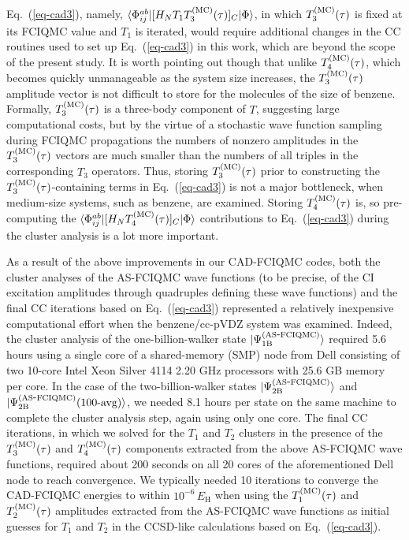 \documentclass[journal=jcp,manuscript=suppinfo]{achemso}
\begin{document}
Eq.\ (\ref{eq-cad3}), namely, $\langle \Phi_{ij}^{ab} | [ H_N T_{1} T_{3}^{\rm (MC)}(\tau) ]_C | \Phi \rangle$,
in which $T_{3}^{\rm (MC)}(\tau)$ is fixed at its FCIQMC value and $T_{1}$ is iterated, would require
additional changes in the CC routines used to set up Eq.\ (\ref{eq-cad3}) in this work, which are beyond the
scope of the present study. It is worth pointing out though that unlike $T_{4}^{\rm (MC)}(\tau)$,
which becomes quickly unmanageable as the system size increases, the $T_{3}^{\rm (MC)}(\tau)$ amplitude
vector is not difficult to store for the molecules of the size of benzene.
Formally, $T_{3}^{\rm (MC)}(\tau)$ is a three-body component of $T$, suggesting large computational costs,
but by the virtue of a stochastic wave function sampling during
FCIQMC propagations the numbers of nonzero amplitudes in the $T_{3}^{\rm (MC)}(\tau)$ vectors
are much smaller than the numbers of all triples in the corresponding $T_{3}$ operators. Thus, storing
$T_{3}^{\rm (MC)}(\tau)$ prior to constructing the $T_{3}^{\rm (MC)}(\tau)$-containing terms in
Eq.\ (\ref{eq-cad3}) is not a major bottleneck, when medium-size systems, such as benzene, are examined.
Storing $T_{4}^{\rm (MC)}(\tau)$ is, so pre-computing the
$\langle \Phi_{ij}^{ab} | [ H_N  T_{4}^{\rm (MC)}(\tau) ]_C | \Phi \rangle$ contributions to
Eq.\ (\ref{eq-cad3}) during the cluster analysis is a lot more important.

As a result of the above improvements in our CAD-FCIQMC codes, both the cluster analyses of the
AS-FCIQMC wave functions (to be precise, of the CI excitation amplitudes through quadruples
defining these wave functions) and the final CC iterations based on Eq.\ (\ref{eq-cad3}) represented a
relatively inexpensive computational effort when the benzene/cc-pVDZ system was examined.
Indeed, the cluster analysis of the one-billion-walker
state $|\Psi_{\rm 1B}^{\rm (AS\mbox{-}FCIQMC)}\rangle$ required 5.6 hours using a single core of
a shared-memory (SMP) node from Dell consisting of two 10-core Intel Xeon Silver 4114 2.20 GHz processors
with 25.6 GB memory per core.
In the case of the two-billion-walker states $|\Psi_{\rm 2B}^{\rm (AS\mbox{-}FCIQMC)}\rangle$ and
$|\Psi_{\rm 2B}^{\rm (AS\mbox{-}FCIQMC)}\mbox{(100-avg)}\rangle$, we needed 8.1 hours per state
on the same machine to complete the cluster analysis step, again using only one core.
The final CC iterations, in which we solved for the
$T_1$ and $T_2$ clusters in the presence of the $T_{3}^{\rm (MC)}(\tau)$ and $T_{4}^{\rm (MC)}(\tau)$
components extracted from the above AS-FCIQMC wave functions, required about 200 seconds
on all 20 cores of the aforementioned Dell node to reach convergence. We typically needed 10 iterations
to converge the CAD-FCIQMC energies to within $10^{-6} \, E_{\text{H}}$ when using the $T_{1}^{\rm (MC)}(\tau)$
and $T_{2}^{\rm (MC)}(\tau)$ amplitudes extracted from the AS-FCIQMC wave functions
as initial guesses for $T_1$ and $T_2$ in the CCSD-like calculations based on Eq.\ (\ref{eq-cad3}).
\end{document}
